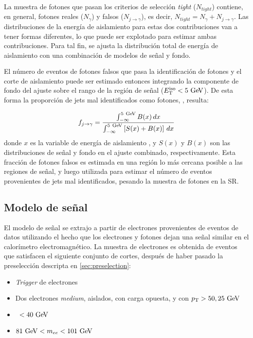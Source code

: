 La muestra de fotones que pasan los criterios de selección \emph{tight}
($N_{tight}$) contiene, en general, fotones reales ($N_{\gamma}$) y falsos
($N_{j\to\gamma}$), es decir, $N_{tight} = N_{\gamma} + N_{j\to\gamma}$.
Las distribuciones de la energía de aislamiento para estas
dos contribuciones van a tener formas diferentes, lo que puede ser explotado
para estimar ambas contribuciones. Para tal fin, se ajusta la distribución
total de energía de aislamiento con una combinación de modelos de señal y fondo.

El número de eventos de fotones falsos que pasa la identificación de fotones y
el corte de aislamiento puede ser estimado entonces integrando la componente de
fondo del ajuste sobre el rango de la región de señal ($\etiso<5\GeV$). De esta
forma la proporción de jets mal identificados como fotones, \fjg, resulta:

\begin{equation}\label{eq:jfake_formula}
  f_{j\to \gamma} = \frac{\int_{-\infty}^{5\gev} B(x)\, dx}{\int_{-\infty}^{5\gev} \left[S(x)+B(x)\right]\, dx}
\end{equation}
%
donde $x$ es la variable de energía de aislamiento \etiso, y $S(x)$ y $B(x)$ son
las distribuciones de señal y fondo en el ajuste combinado, respectivamente.
Esta fracción de fotones falsos es estimada en una región lo más cercana posible
a las regiones de señal, y luego utilizada para estimar el número de eventos
provenientes de jets mal identificados, pesando la muestra de fotones en la SR.


\subsection{Modelo de señal} \label{sec:jfake_sig_template}

El modelo de señal se extrajo a partir de electrones provenientes de eventos de datos {\Zee}
utilizando el hecho que los
electrones y fotones dejan una señal similar en el calorímetro
electromagnético. La muestra de electrones es obtenida de eventos que satisfacen
el siguiente conjunto de cortes, después de haber pasado la preselección
descripta en \cref{sec:preselection}:

\begin{itemize}\itemsep0.1cm
\item \emph{Trigger} de electrones %
\item Dos electrones \emph{medium}, aislados, con carga opuesta, y con $\pt>50,25\gev$
\item \MET\ $<40\gev$
\item $81\gev<m_{ee}<101\gev$
\end{itemize}

